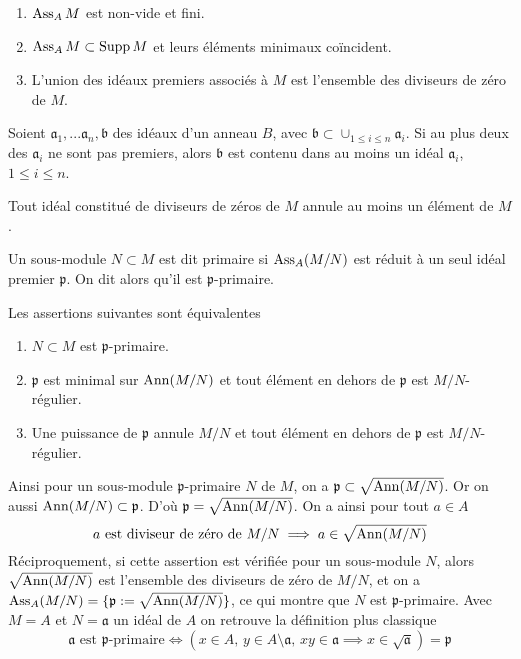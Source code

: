 \begin{prop}\label{AssociatedPrimesProp1}
\begin{enumerate}
\item $\operatorname{Ass}_A M$ est non-vide et fini.
\item $\operatorname{Ass}_A M\subset \operatorname{Supp} M$ et leurs éléments minimaux coïncident.
\item L'union des idéaux premiers associés à $M$ est l'ensemble des diviseurs de zéro de $M$.
\end{enumerate}
\end{prop}

\begin{prop}
Soient $\mathfrak{a}_1,...\mathfrak{a}_n, \mathfrak{b}$ des idéaux d'un anneau $B$, avec $\mathfrak{b}\subset \cup_{1\leq i\leq n}\mathfrak{a}_i$. Si au plus deux des $\mathfrak{a}_i$ ne sont pas premiers, alors $\mathfrak{b}$ est contenu dans au moins un idéal $\mathfrak{a}_i$, $1\leq i\leq n$.
\end{prop}

\begin{cor}\label{AssociatedPrimesProp2}
Tout idéal constitué de diviseurs de zéros de $M$ annule au moins un élément de $M$.
\end{cor}

\begin{defn}
Un sous-module $N\subset M$ est dit primaire si $\operatorname{Ass}_A(M/N)$ est réduit à un seul idéal premier $\mathfrak{p}$. On dit alors qu'il est $\mathfrak{p}$-primaire.
\end{defn}

\begin{prop}
Les assertions suivantes sont équivalentes
\begin{enumerate}
\item $N\subset M$ est $\mathfrak{p}$-primaire.
\item $\mathfrak{p}$ est minimal sur $\operatorname{Ann}(M/N)$ et tout élément en dehors de $\mathfrak{p}$ est $M/N$-régulier.
\item Une puissance de $\mathfrak{p}$ annule $M/N$ et tout élément en dehors de $\mathfrak{p}$ est $M/N$-régulier.
\end{enumerate}
\end{prop}

\begin{rem}
Ainsi pour un sous-module $\mathfrak{p}$-primaire $N$ de $M$, on a $\mathfrak{p}\subset \sqrt{\operatorname{Ann}(M/N)}$. Or on aussi $\operatorname{Ann}(M/N)\subset \mathfrak{p}$. D'où $\mathfrak{p}=\sqrt{\operatorname{Ann}(M/N)}$. On a ainsi pour tout $a\in A$
$$a\text{ est diviseur de zéro de } M/N \implies a\in\sqrt{\operatorname{Ann}(M/N)}$$
Réciproquement, si cette assertion est vérifiée pour un sous-module $N$, alors $\sqrt{\operatorname{Ann}(M/N)}$ est l'ensemble des diviseurs de zéro de $M/N$, et on a $\operatorname{Ass}_A(M/N)=\lbrace \mathfrak{p}:=\sqrt{\operatorname{Ann}(M/N)}\rbrace$, ce qui montre que $N$ est $\mathfrak{p}$-primaire. Avec $M=A$ et $N=\mathfrak{a}$ un idéal de $A$ on retrouve la définition plus classique
$$\mathfrak{a}\text{ est }\mathfrak{p}\text{-primaire} \iff (x\in A,\, y\in A\setminus\mathfrak{a},\,xy\in\mathfrak{a}\implies x\in \sqrt{\mathfrak{a}})=\mathfrak{p}$$
\end{rem}

